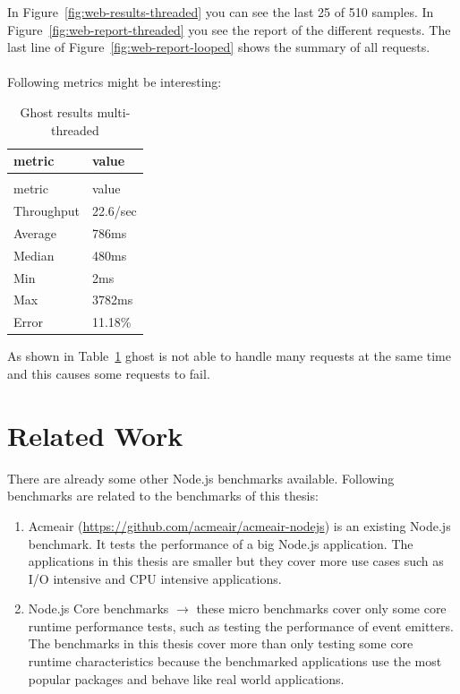 In Figure~\ref{fig:web-results-threaded} you can see the last 25 of 510 samples. In Figure~\ref{fig:web-report-threaded} you see the report of the different requests. The last line of Figure~\ref{fig:web-report-looped} shows the summary of all requests. \\ \\
Following metrics might be interesting: \\
\begin{longtable}{ll}
	\caption{Ghost results multi-threaded}\\
	\label{tab:ghost-results-multi-threaded}
	metric&value\\
	\hline
	\endfirsthead
	\caption[]{Ghost results multi-threaded}\\
	metric&value\\
	\hline
	\endhead
	Throughput & 22.6/sec \\
	Average & 786ms \\
	Median & 480ms \\
	Min & 2ms \\
	Max & 3782ms \\
	Error & 11.18\% \\
\end{longtable}

As shown in Table~\ref{tab:ghost-results-multi-threaded} ghost is not able to handle many requests at the same time and this causes some requests to fail.

\chapter{Related Work}
There are already some other Node.js benchmarks available. Following benchmarks are related to the benchmarks of this thesis:

\begin{enumerate}
	\item Acmeair (\url{https://github.com/acmeair/acmeair-nodejs}) is an existing Node.js benchmark. It tests the performance of a big Node.js application. The applications in this thesis are smaller but they cover more use cases such as I/O intensive and CPU intensive applications.
	\item Node.js Core benchmarks $\rightarrow$ these micro benchmarks cover only some core runtime performance tests, such as testing the performance of event emitters. The benchmarks in this thesis cover more than only testing some core runtime characteristics because the benchmarked applications use the most popular packages and behave like real world applications.
\end{enumerate}




